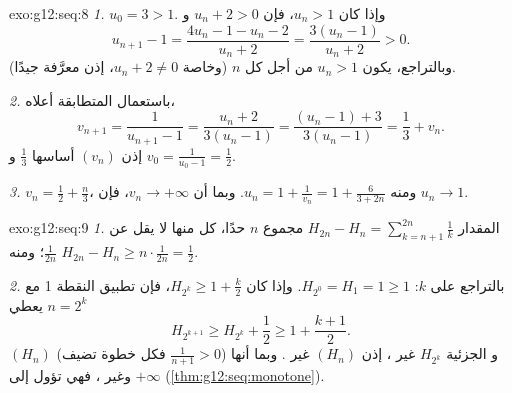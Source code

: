 \begin{solution}{exo:g12:seq:8}
\emph{1.} $u_0 = 3 > 1$. وإذا كان $u_n > 1$، فإن $u_n + 2 > 0$ و
\[
u_{n+1} - 1 = \frac{4u_n - 1 - u_n - 2}{u_n + 2} = \frac{3(u_n - 1)}{u_n + 2} > 0 .
\]
وبالتراجع، يكون $u_n > 1$ من أجل كل $n$ (وخاصة $u_n + 2 \neq 0$، إذن
 معرَّفة جيدًا).

\emph{2.} باستعمال المتطابقة أعلاه،
\[
v_{n+1} = \frac{1}{u_{n+1} - 1} = \frac{u_n + 2}{3(u_n - 1)}
= \frac{(u_n - 1) + 3}{3(u_n - 1)} = \frac{1}{3} + v_n .
\]
إذن $(v_n)$  أساسها $\frac13$ و
$v_0 = \frac{1}{u_0 - 1} = \frac12$.

\emph{3.} $v_n = \frac12 + \frac{n}{3}$، ومنه
$u_n = 1 + \frac{1}{v_n} = 1 + \frac{6}{3 + 2n}$. وبما أن $v_n \to +\infty$،
فإن $u_n \to 1$.
\end{solution}

\begin{solution}{exo:g12:seq:9}
\emph{1.} المقدار $H_{2n} - H_n = \sum_{k=n+1}^{2n} \frac{1}{k}$ مجموع $n$
حدًا، كل منها لا يقل عن $\frac{1}{2n}$؛ ومنه
$H_{2n} - H_n \geq n \cdot \frac{1}{2n} = \frac12$.

\emph{2.} بالتراجع على $k$: $H_{2^0} = H_1 = 1 \geq 1$. وإذا كان
$H_{2^k} \geq 1 + \frac{k}{2}$، فإن تطبيق النقطة 1 مع $n = 2^k$ يعطي
\[
H_{2^{k+1}} \geq H_{2^k} + \frac12 \geq 1 + \frac{k+1}{2}.
\]
 $(H_n)$  (فكل خطوة تضيف $\frac{1}{n+1} > 0$) و
 الجزئية $H_{2^k}$ غير ، إذن $(H_n)$ غير .
وبما أنها  وغير ، فهي تؤول إلى $+\infty$
(\cref{thm:g12:seq:monotone}).
\end{solution}

